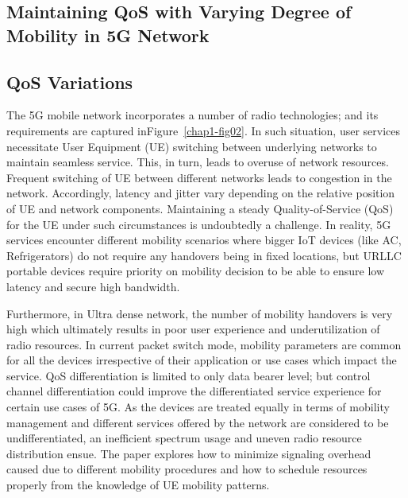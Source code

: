\begin{multicols}{2}
\section{Maintaining QoS with Varying Degree of Mobility in 5G Network}

\subsection{QoS Variations}

The 5G mobile network incorporates a number of radio technologies; and its requirements are captured in\break Figure~\ref{chap1-fig02}. In such situation, user services necessitate User Equipment (UE) switching between underlying networks to maintain seamless service. This, in turn, leads to overuse of network resources. Frequent switching of UE between different networks leads to congestion in the network. Accordingly, latency and jitter vary depending on the relative position of UE and network components. Maintaining a steady Quality-of-Service (QoS) for the UE under such circumstances is undoubtedly a challenge. In reality, 5G services encounter different mobility scenarios where bigger IoT devices (like AC, Refrigerators) do not require any handovers being in fixed locations, but URLLC portable devices require priority on mobility decision to be able to ensure low latency and secure high bandwidth.

Furthermore, in Ultra dense network, the number of mobility handovers is very high which ultimately results in poor user experience and underutilization of radio resources. In current packet switch mode, mobility parameters are common for all the devices irrespective of their application or use cases which impact the service. QoS differentiation is limited to only data bearer level; but control channel differentiation could improve the differentiated service experience for certain use cases of 5G. As the devices are treated equally in terms of mobility management and different services offered by the network are considered to be undifferentiated, an inefficient spectrum usage and uneven radio resource distribution ensue. The paper \cite{art1-key01} explores how to minimize signaling overhead caused due to different mobility procedures and how to schedule resources properly from the knowledge of UE mobility patterns.


\end{multicols}
